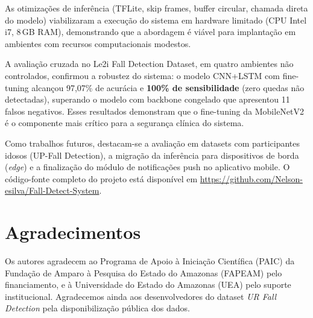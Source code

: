 \documentclass[12pt,a4paper]{article}
\begin{document}
As otimizações de inferência (TFLite, skip frames, buffer circular, chamada direta do modelo) viabilizaram a execução do sistema em hardware limitado (CPU Intel i7, 8\,GB RAM), demonstrando que a abordagem é viável para implantação em ambientes com recursos computacionais modestos.

A avaliação cruzada no Le2i Fall Detection Dataset, em quatro ambientes não controlados, confirmou a robustez do sistema: o modelo CNN+LSTM com fine-tuning alcançou 97,07\% de acurácia e \textbf{100\% de sensibilidade} (zero quedas não detectadas), superando o modelo com backbone congelado que apresentou 11 falsos negativos. Esses resultados demonstram que o fine-tuning da MobileNetV2 é o componente mais crítico para a segurança clínica do sistema.

Como trabalhos futuros, destacam-se a avaliação em datasets com participantes idosos (UP-Fall Detection), a migração da inferência para dispositivos de borda (\textit{edge}) e a finalização do módulo de notificações push no aplicativo mobile. O código-fonte completo do projeto está disponível em \url{https://github.com/Nelson-esilva/Fall-Detect-System}.

\section*{Agradecimentos}

Os autores agradecem ao Programa de Apoio à Iniciação Científica (PAIC) da Fundação de Amparo à Pesquisa do Estado do Amazonas (FAPEAM) pelo financiamento, e à Universidade do Estado do Amazonas (UEA) pelo suporte institucional. Agradecemos ainda aos desenvolvedores do dataset \textit{UR Fall Detection} pela disponibilização pública dos dados.
\end{document}
